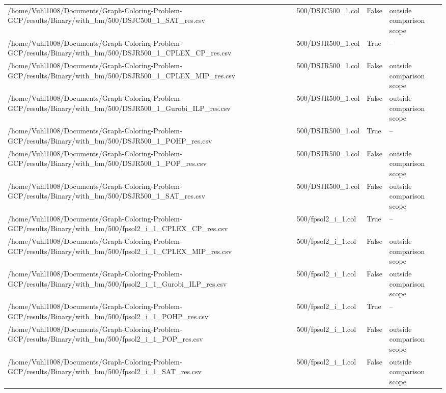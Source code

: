 \begin{table}[htbp]
\begin{tabular}{llll}
/home/Vuhl1008/Documents/Graph-Coloring-Problem-GCP/results/Binary/with\_bm/500/DSJC500\_1\_SAT\_res.csv & 500/DSJC500\_1.col & False & outside comparison scope \\
/home/Vuhl1008/Documents/Graph-Coloring-Problem-GCP/results/Binary/with\_bm/500/DSJR500\_1\_CPLEX\_CP\_res.csv & 500/DSJR500\_1.col & True & -- \\
/home/Vuhl1008/Documents/Graph-Coloring-Problem-GCP/results/Binary/with\_bm/500/DSJR500\_1\_CPLEX\_MIP\_res.csv & 500/DSJR500\_1.col & False & outside comparison scope \\
/home/Vuhl1008/Documents/Graph-Coloring-Problem-GCP/results/Binary/with\_bm/500/DSJR500\_1\_Gurobi\_ILP\_res.csv & 500/DSJR500\_1.col & False & outside comparison scope \\
/home/Vuhl1008/Documents/Graph-Coloring-Problem-GCP/results/Binary/with\_bm/500/DSJR500\_1\_POHP\_res.csv & 500/DSJR500\_1.col & True & -- \\
/home/Vuhl1008/Documents/Graph-Coloring-Problem-GCP/results/Binary/with\_bm/500/DSJR500\_1\_POP\_res.csv & 500/DSJR500\_1.col & False & outside comparison scope \\
/home/Vuhl1008/Documents/Graph-Coloring-Problem-GCP/results/Binary/with\_bm/500/DSJR500\_1\_SAT\_res.csv & 500/DSJR500\_1.col & False & outside comparison scope \\
/home/Vuhl1008/Documents/Graph-Coloring-Problem-GCP/results/Binary/with\_bm/500/fpsol2\_i\_1\_CPLEX\_CP\_res.csv & 500/fpsol2\_i\_1.col & True & -- \\
/home/Vuhl1008/Documents/Graph-Coloring-Problem-GCP/results/Binary/with\_bm/500/fpsol2\_i\_1\_CPLEX\_MIP\_res.csv & 500/fpsol2\_i\_1.col & False & outside comparison scope \\
/home/Vuhl1008/Documents/Graph-Coloring-Problem-GCP/results/Binary/with\_bm/500/fpsol2\_i\_1\_Gurobi\_ILP\_res.csv & 500/fpsol2\_i\_1.col & False & outside comparison scope \\
/home/Vuhl1008/Documents/Graph-Coloring-Problem-GCP/results/Binary/with\_bm/500/fpsol2\_i\_1\_POHP\_res.csv & 500/fpsol2\_i\_1.col & True & -- \\
/home/Vuhl1008/Documents/Graph-Coloring-Problem-GCP/results/Binary/with\_bm/500/fpsol2\_i\_1\_POP\_res.csv & 500/fpsol2\_i\_1.col & False & outside comparison scope \\
/home/Vuhl1008/Documents/Graph-Coloring-Problem-GCP/results/Binary/with\_bm/500/fpsol2\_i\_1\_SAT\_res.csv & 500/fpsol2\_i\_1.col & False & outside comparison scope \\

\end{tabular}
\end{table}
